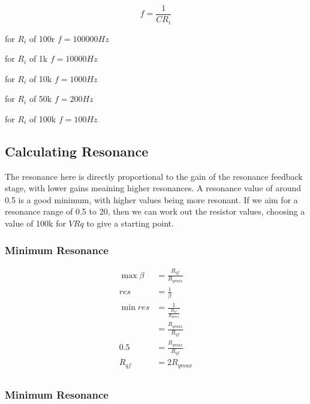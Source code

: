 \documentclass{article}
\begin{document}
\begin{equation}
  f = \frac{1}{CR_i}
\end{equation}

\begin{description}
  \item for $R_i$ of 100r $f = 100000Hz$
  \item for $R_i$ of 1k   $f = 10000Hz$
  \item for $R_i$ of 10k  $f = 1000Hz$
  \item for $R_i$ of 50k  $f = 200Hz$
  \item for $R_i$ of 100k $f = 100Hz$
\end{description}

\subsection{Calculating Resonance}

The resonance here is directly proportional to the gain of the resonance feedback stage, with lower gains meaining higher resonances. A resonance value of around 0.5 is a good minimum, with higher values being more resonant. If we aim for a resonance range of 0.5 to 20, then we can work out the resistor values, choosing a value of 100k for $VRq$ to give a starting point.

\subsubsection{Minimum Resonance}

\begin{equation*}
\begin{split}
  {\max \beta} & = \frac{R_{qf}}{R_{qmax}} \\
  res          & = \frac{1}{\beta} \\
  {\min res}   & = \frac{1}{\frac{R_{qf}}{R_{qmax}}} \\
               & = \frac{R_{qmax}}{R_{qf}} \\
  0.5          & = \frac{R_{qmax}}{R_{qf}} \\
  R_{qf}       & = 2 R_{qmax} \\
\end{split}
\end{equation*}

\subsubsection{Minimum Resonance}
\end{document}
